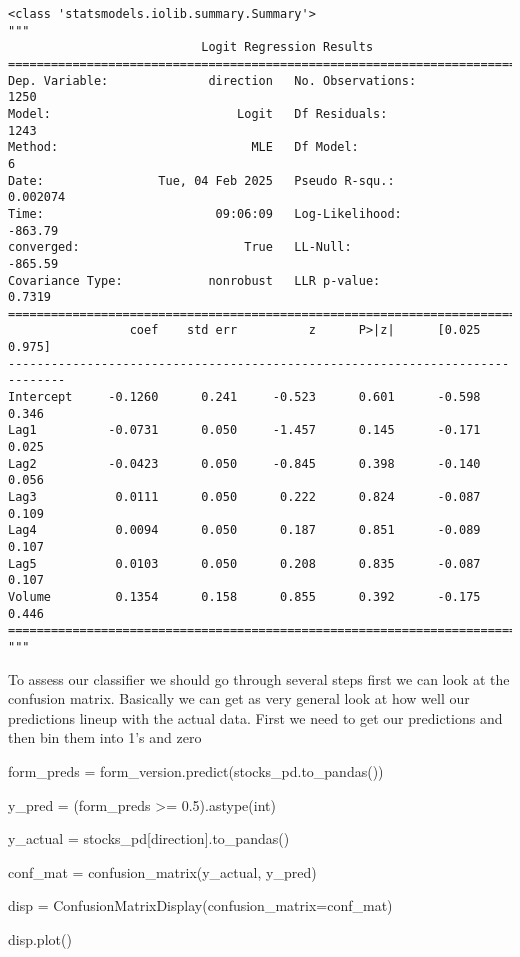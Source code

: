 \documentclass[
  letterpaper,
  DIV=11,
  numbers=noendperiod]{scrreprt}
\newenvironment{Shaded}{\begin{snugshade}}{\end{snugshade}}
\newcommand{\BuiltInTok}[1]{\textcolor[rgb]{0.00,0.23,0.31}{#1}}
\newcommand{\FloatTok}[1]{\textcolor[rgb]{0.68,0.00,0.00}{#1}}
\newcommand{\NormalTok}[1]{\textcolor[rgb]{0.00,0.23,0.31}{#1}}
\newcommand{\OperatorTok}[1]{\textcolor[rgb]{0.37,0.37,0.37}{#1}}
\newcommand{\StringTok}[1]{\textcolor[rgb]{0.13,0.47,0.30}{#1}}
\begin{document}
\begin{verbatim}
<class 'statsmodels.iolib.summary.Summary'>
"""
                           Logit Regression Results                           
==============================================================================
Dep. Variable:              direction   No. Observations:                 1250
Model:                          Logit   Df Residuals:                     1243
Method:                           MLE   Df Model:                            6
Date:                Tue, 04 Feb 2025   Pseudo R-squ.:                0.002074
Time:                        09:06:09   Log-Likelihood:                -863.79
converged:                       True   LL-Null:                       -865.59
Covariance Type:            nonrobust   LLR p-value:                    0.7319
==============================================================================
                 coef    std err          z      P>|z|      [0.025      0.975]
------------------------------------------------------------------------------
Intercept     -0.1260      0.241     -0.523      0.601      -0.598       0.346
Lag1          -0.0731      0.050     -1.457      0.145      -0.171       0.025
Lag2          -0.0423      0.050     -0.845      0.398      -0.140       0.056
Lag3           0.0111      0.050      0.222      0.824      -0.087       0.109
Lag4           0.0094      0.050      0.187      0.851      -0.089       0.107
Lag5           0.0103      0.050      0.208      0.835      -0.087       0.107
Volume         0.1354      0.158      0.855      0.392      -0.175       0.446
==============================================================================
"""
\end{verbatim}

To assess our classifier we should go through several steps first we can
look at the confusion matrix. Basically we can get as very general look
at how well our predictions lineup with the actual data. First we need
to get our predictions and then bin them into 1's and zero

\begin{Shaded}
\begin{Highlighting}[]
\NormalTok{form\_preds }\OperatorTok{=}\NormalTok{ form\_version.predict(stocks\_pd.to\_pandas())}

\NormalTok{y\_pred }\OperatorTok{=}\NormalTok{ (form\_preds }\OperatorTok{\textgreater{}=} \FloatTok{0.5}\NormalTok{).astype(}\BuiltInTok{int}\NormalTok{)}

\NormalTok{y\_actual }\OperatorTok{=}\NormalTok{ stocks\_pd[}\StringTok{\textquotesingle{}direction\textquotesingle{}}\NormalTok{].to\_pandas()}

\NormalTok{conf\_mat }\OperatorTok{=}\NormalTok{ confusion\_matrix(y\_actual, y\_pred)}

\NormalTok{disp }\OperatorTok{=}\NormalTok{ ConfusionMatrixDisplay(confusion\_matrix}\OperatorTok{=}\NormalTok{conf\_mat)}

\NormalTok{disp.plot()}
\end{Highlighting}
\end{Shaded}
\end{document}
